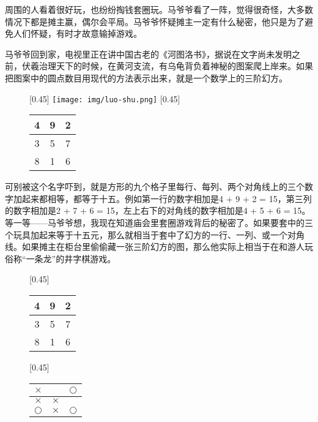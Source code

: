\documentclass[UTF8]{article}
\begin{document}
周围的人看着很好玩，也纷纷掏钱套圈玩。马爷爷看了一阵，觉得很奇怪，大多数情况下都是摊主赢，偶尔会平局。马爷爷怀疑摊主一定有什么秘密，他只是为了避免人们怀疑，有时才故意输掉游戏。

马爷爷回到家，电视里正在讲中国古老的《河图洛书》，据说在文字尚未发明之前，伏羲治理天下的时候，在黄河支流，有乌龟背负着神秘的图案爬上岸来。如果把图案中的圆点数目用现代的方法表示出来，就是一个数学上的三阶幻方。

\begin{figure}[htbp]
 \centering
 [0.45\linewidth]{ \texttt{[image: img/luo-shu.png]}}
 [0.45\linewidth]{
   \begin{tabular}{|c|c|c|}
   \hline
   4 & 9 & 2 \\
   \hline
   3 & 5 & 7 \\
   \hline
   8 & 1 & 6 \\
   \hline
   \end{tabular}
   \vspace{8mm}
 }
 \captionsetup{labelformat=empty}
 \caption{}
 \label{fig:luo-shu}
\end{figure}

可别被这个名字吓到，就是方形的九个格子里每行、每列、两个对角线上的三个数字加起来都相等，都等于十五。例如第一行的数字相加是4 + 9 + 2 = 15，第三列的数字相加是2 + 7 + 6 = 15，左上右下的对角线的数字相加是4 + 5 + 6 = 15。等一等——马爷爷想，我现在知道庙会里套圈游戏背后的秘密了。如果要套中的三个玩具加起来等于十五元，那么就相当于套中了幻方的一行、一列、或一个对角线。如果摊主在柜台里偷偷藏一张三阶幻方的图，那么他实际上相当于在和游人玩俗称“一条龙”的井字棋游戏。

\begin{figure}[htbp]
 \centering
 [0.45\linewidth]{
   \begin{tabular}{|c|c|c|}
   \hline
   4 & 9 & 2 \\
   \hline
   3 & 5 & 7 \\
   \hline
   8 & 1 & 6 \\
   \hline
   \end{tabular}
   \vspace{3mm}
 }
 [0.45\linewidth]{
   \begin{tabular}{c|c|c}
   $\times$ &  & $\bigcirc$ \\
   \hline
   $\times$ & $\times$ &  \\
   \hline
   $\bigcirc$ & $\times$ & $\bigcirc$ \\
   \end{tabular}
   \vspace{3mm}
 }
 \captionsetup{labelformat=empty}
 \caption{}
 \label{fig:bingo-magic-square}
\end{figure}
\end{document}
